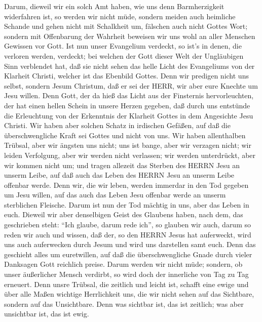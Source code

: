  Darum, dieweil wir ein solch Amt haben, wie uns denn
Barmherzigkeit widerfahren ist, so werden wir nicht müde, 
sondern meiden auch heimliche Schande und gehen nicht mit Schalkheit um,
fälschen auch nicht Gottes Wort; sondern mit Offenbarung der Wahrheit
beweisen wir uns wohl an aller Menschen Gewissen vor Gott. 
Ist nun unser Evangelium verdeckt, so ist's in denen, die verloren
werden, verdeckt;  bei welchen der Gott dieser Welt der
Ungläubigen Sinn verblendet hat, daß sie nicht sehen das helle Licht des
Evangeliums von der Klarheit Christi, welcher ist das Ebenbild Gottes.
 Denn wir predigen nicht uns selbst, sondern Jesum Christum,
daß er sei der HERR, wir aber eure Knechte um Jesu willen. 
Denn Gott, der da hieß das Licht aus der Finsternis hervorleuchten, der
hat einen hellen Schein in unsere Herzen gegeben, daß durch uns
entstünde die Erleuchtung von der Erkenntnis der Klarheit Gottes in dem
Angesichte Jesu Christi.  Wir haben aber solchen Schatz in
irdischen Gefäßen, auf daß die überschwengliche Kraft sei Gottes und
nicht von uns.  Wir haben allenthalben Trübsal, aber wir
ängsten uns nicht; uns ist bange, aber wir verzagen nicht; 
wir leiden Verfolgung, aber wir werden nicht verlassen; wir werden
unterdrückt, aber wir kommen nicht um;  und tragen allezeit
das Sterben des HERRN Jesu an unserm Leibe, auf daß auch das Leben des
HERRN Jesu an unserm Leibe offenbar werde.  Denn wir, die
wir leben, werden immerdar in den Tod gegeben um Jesu willen, auf das
auch das Leben Jesu offenbar werde an unserm sterblichen Fleische.
 Darum ist nun der Tod mächtig in uns, aber das Leben in
euch.  Dieweil wir aber denselbigen Geist des Glaubens
haben, nach dem, das geschrieben steht: ``Ich glaube, darum rede ich'',
so glauben wir auch, darum so reden wir auch  und wissen,
daß der, so den HERRN Jesus hat auferweckt, wird uns auch auferwecken
durch Jesum und wird uns darstellen samt euch.  Denn das
geschieht alles um euretwillen, auf daß die überschwengliche Gnade durch
vieler Danksagen Gott reichlich preise.  Darum werden wir
nicht müde; sondern, ob unser äußerlicher Mensch verdirbt, so wird doch
der innerliche von Tag zu Tag erneuert.  Denn unsre
Trübsal, die zeitlich und leicht ist, schafft eine ewige und über alle
Maßen wichtige Herrlichkeit  uns, die wir nicht sehen auf
das Sichtbare, sondern auf das Unsichtbare. Denn was sichtbar ist, das
ist zeitlich; was aber unsichtbar ist, das ist ewig.

